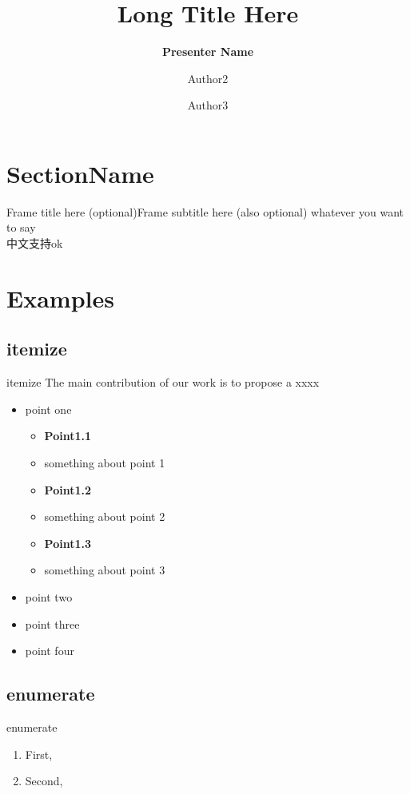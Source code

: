 \documentclass{beamer}
\title[Short Title]{Long Title Here}
\author[Presenter Name]{\textbf{Presenter Name} \and Author2 \and Author3}
\institute[Fudan University]{
    School of Computer Science, Fudan University, Shanghai, China \\
    Shanghai Key Laboratory of Data Science, Shanghai, China \\
    Shanghai Institute of Intelligent Electronics \& Systems \\~\\
    \tiny{This work is partially supported by xxx}
}
\begin{document}
\begin{frame}
  \titlepage
\end{frame}

\section{SectionName}
\begin{frame}{Frame title here (optional)}{Frame subtitle here (also optional)}
  whatever you want to say\\
  中文支持ok
\end{frame}

\section{Examples}
\subsection{itemize}
\begin{frame}[t]{itemize}
  The main contribution of our work is to propose a xxxx
  \begin{itemize}
    \item point one
          \begin{itemize}
            \item \textbf{Point1.1}
            \item something about point 1
            \item \textbf{Point1.2}
            \item something about point 2
            \item \textbf{Point1.3}
            \item something about point 3
          \end{itemize}
    \item point two
    \item point three
    \item point four
  \end{itemize}
\end{frame}

\subsection{enumerate}
\begin{frame}[t]{enumerate}
  \begin{enumerate}
    \item First,
    \item Second,
  \end{enumerate}
\end{frame}
\end{document}
